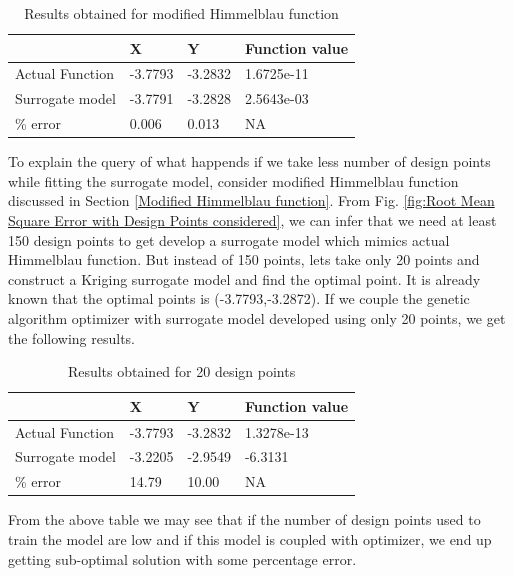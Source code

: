 \begin{table}[H]
	\centering
	\caption{Results obtained for modified Himmelblau function}
	\label{Results obtained for modified Himmelblau function}
	\begin{tabular}{llll}
		\hline \hline
		& X & Y & Function value \\ \hline
		Actual Function & -3.7793 &-3.2832 &1.6725e-11 \\
		Surrogate model & -3.7791 &-3.2828 & 2.5643e-03 \\ \hline
		\% error & 0.006 & 0.013 & NA \\
		\hline \hline
		
	\end{tabular}
\end{table}

To explain the query of what happends if we take less number of design points while fitting the surrogate model, consider modified Himmelblau function discussed in Section \ref{Modified Himmelblau function}. From Fig. \ref{fig:Root Mean Square Error with Design Points considered}, we can infer that we need at least 150 design points to get develop a surrogate model which mimics actual Himmelblau function. But instead of 150 points, lets take only 20 points and construct a Kriging surrogate model and find the optimal point. It is already known that the optimal points is  (-3.7793,-3.2872). If we couple the genetic algorithm optimizer with surrogate model developed using only 20 points, we get the following results.
\begin{table}[H]
	\centering
	\caption{Results obtained for 20 design points}
	\label{Results obtained for 20 design points}
	\begin{tabular}{llll}
		\hline \hline
		& X & Y & Function value \\ \hline
		Actual Function & -3.7793 &-3.2832 &1.3278e-13 \\
		Surrogate model & -3.2205 &-2.9549 & -6.3131 \\ \hline
		\% error & 14.79 & 10.00 & NA \\
		\hline \hline
	\end{tabular}
\end{table}
From the above table we may see that if the number of design points used to train the model are low and if this model is coupled with optimizer, we end up getting sub-optimal solution with some percentage error.







